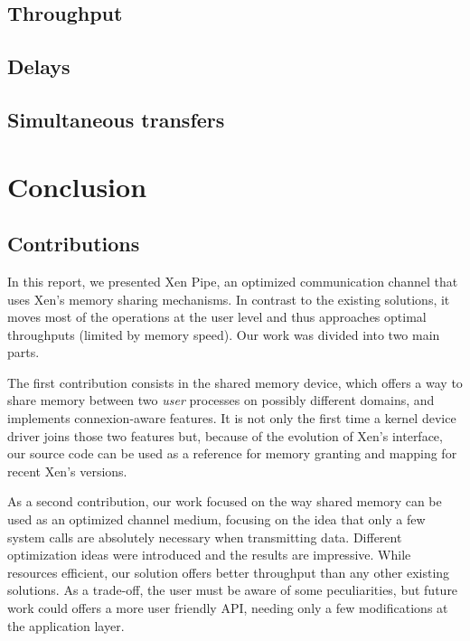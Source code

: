 \documentclass[journal]{IEEEtran}
\begin{document}
\subsection{Throughput}





\subsection{Delays}

\subsection{Simultaneous transfers}






\section{Conclusion}

\subsection{Contributions}

In this report, we presented Xen Pipe, an optimized communication channel that uses Xen's memory sharing mechanisms. In contrast to the existing solutions, it moves most of the operations at the user level and thus approaches optimal throughputs (limited by memory speed). Our work was divided into two main parts.

The first contribution consists in the shared memory device, which offers a way to share memory between two \emph{user} processes on possibly different domains, and implements connexion-aware features. It is not only the first time a kernel device driver joins those two features but, because of the evolution of Xen's interface, our source code can be used as a reference for memory granting and mapping for recent Xen's versions.

As a second contribution, our work focused on the way shared memory can be used as an optimized channel medium, focusing on the idea that only a few system calls are absolutely necessary when transmitting data. Different optimization ideas were introduced and the results are impressive. While resources efficient, our solution offers better throughput than any other existing solutions. As a trade-off, the user must be aware of some peculiarities, but future work could offers a more user friendly API, needing only a few modifications at the application layer.
\end{document}
